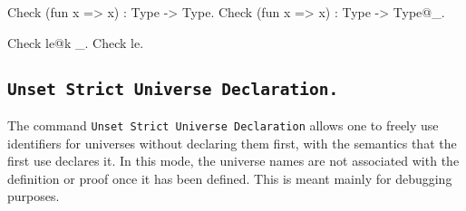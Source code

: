 \begin{coq_example}
  Check (fun x => x) : Type -> Type.
  Check (fun x => x) : Type -> Type@{_}.

  Check le@{k _}.
  Check le.
\end{coq_example}

\subsection{\tt Unset Strict Universe Declaration.
  \label{StrictUniverseDeclaration}}

The command \texttt{Unset Strict Universe Declaration} allows one to
freely use identifiers for universes without declaring them first, with
the semantics that the first use declares it. In this mode, the universe
names are not associated with the definition or proof once it has been
defined. This is meant mainly for debugging purposes.

